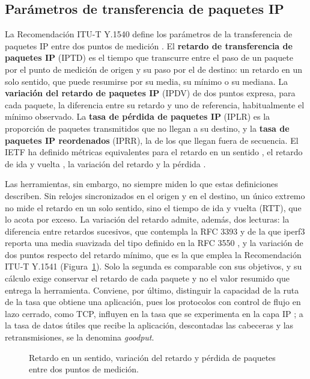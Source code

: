 \subsection{Parámetros de transferencia de paquetes IP}

La Recomendación ITU-T Y.1540 define los parámetros de la transferencia de paquetes IP entre dos puntos de medición \cite{ituy1540}. El \textbf{retardo de transferencia de paquetes IP} (IPTD) es el tiempo que transcurre entre el paso de un paquete por el punto de medición de origen y su paso por el de destino: un retardo en un solo sentido, que puede resumirse por su media, su mínimo o su mediana. La \textbf{variación del retardo de paquetes IP} (IPDV) de dos puntos expresa, para cada paquete, la diferencia entre su retardo y uno de referencia, habitualmente el mínimo observado. La \textbf{tasa de pérdida de paquetes IP} (IPLR) es la proporción de paquetes transmitidos que no llegan a su destino, y la \textbf{tasa de paquetes IP reordenados} (IPRR), la de los que llegan fuera de secuencia. El IETF ha definido métricas equivalentes para el retardo en un sentido \cite{rfc7679}, el retardo de ida y vuelta \cite{rfc2681}, la variación del retardo \cite{rfc3393} y la pérdida \cite{rfc7680}.

Las herramientas, sin embargo, no siempre miden lo que estas definiciones describen. Sin relojes sincronizados en el origen y en el destino, un único extremo no mide el retardo en un solo sentido, sino el tiempo de ida y vuelta (RTT), que lo acota por exceso. La variación del retardo admite, además, dos lecturas: la diferencia entre retardos sucesivos, que contempla la RFC 3393 y de la que iperf3 reporta una media suavizada del tipo definido en la RFC 3550 \cite{rfc3550}, y la variación de dos puntos respecto del retardo mínimo, que es la que emplea la Recomendación ITU-T Y.1541 (Figura~\ref{fig:parametros_y1540}). Solo la segunda es comparable con sus objetivos, y su cálculo exige conservar el retardo de cada paquete y no el valor resumido que entrega la herramienta. Conviene, por último, distinguir la capacidad de la ruta de la tasa que obtiene una aplicación, pues los protocolos con control de flujo en lazo cerrado, como TCP, influyen en la tasa que se experimenta en la capa IP \cite{ituy1540}; a la tasa de datos útiles que recibe la aplicación, descontadas las cabeceras y las retransmisiones, se la denomina \textit{goodput}.

\begin{figure}[htbp]
  \centering
  
  \caption{Retardo en un sentido, variación del retardo y pérdida de paquetes entre dos puntos de medición.}
  \label{fig:parametros_y1540}
  \raggedright
\end{figure}

